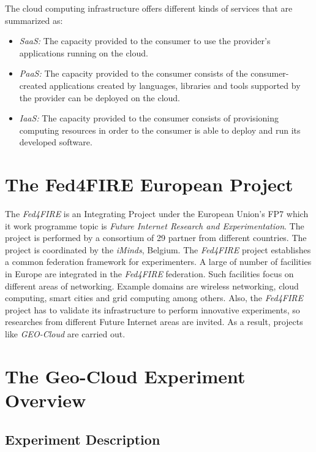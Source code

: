 The cloud computing infrastructure offers different kinds of services that are
summarized as:

\begin{itemize}
\item \emph{\ac{SaaS}:} The capacity provided to the consumer
  to use   the provider's applications running on the cloud.
\item \emph{\ac{PaaS}:} The capacity provided to the consumer
  consists of the consumer-created applications created by languages, libraries
  and tools supported by the provider can be deployed on the cloud.
\item \emph{\ac{IaaS}:} The capacity provided to the
  consumer consists of provisioning computing resources in order to the consumer
  is able to deploy and run its developed software.
\end{itemize}



\section{The Fed4FIRE European Project}%
The \emph{Fed4FIRE} is an Integrating Project under the European Union's \ac{FP7} which it work programme topic is \emph{Future
  Internet Research and Experimentation}. The project is performed by a
consortium of 29 partner from different countries. The project is coordinated by
the \emph{iMinds}, Belgium.
The \emph{Fed4FIRE} project establishes a common federation framework for
experimenters. A large of number of facilities in Europe are integrated in the
\emph{Fed4FIRE} federation. Such facilities focus on different  areas
of networking. Example domains are wireless networking, cloud computing, smart
cities and grid computing among others.
Also, the \emph{Fed4FIRE} project has to validate its infrastructure to perform
innovative experiments, so researches from different Future Internet areas
are invited. As a result, projects like \emph{GEO-Cloud} are carried out.

\section{The Geo-Cloud Experiment Overview}


\subsection{Experiment Description}

